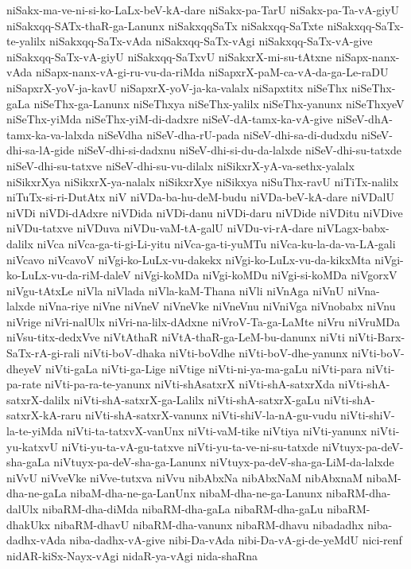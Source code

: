 {niSakx-ma-ve-ni-si-ko-LaLx-beV-kA-dare
niSakx-pa-TarU
niSakx-pa-Ta-vA-giyU
niSakxqq-SATx-thaR-ga-Lanunx
niSakxqqSaTx
niSakxqq-SaTxte
niSakxqq-SaTx-te-yalilx
niSakxqq-SaTx-vAda
niSakxqq-SaTx-vAgi
niSakxqq-SaTx-vA-give
niSakxqq-SaTx-vA-giyU
niSakxqq-SaTxvU
niSakxrX-mi-su-tAtxne
niSapx-nanx-vAda
niSapx-nanx-vA-gi-ru-vu-da-riMda
niSapxrX-paM-ca-vA-da-ga-Le-raDU
niSapxrX-yoV-ja-kavU
niSapxrX-yoV-ja-ka-valalx
niSapxtitx
niSeThx
niSeThx-gaLa
niSeThx-ga-Lanunx
niSeThxya
niSeThx-yalilx
niSeThx-yanunx
niSeThxyeV
niSeThx-yiMda
niSeThx-yiM-di-dadxre
niSeV-dA-tamx-ka-vA-give
niSeV-dhA-tamx-ka-va-lalxda
niSeVdha
niSeV-dha-rU-pada
niSeV-dhi-sa-di-dudxdu
niSeV-dhi-sa-lA-gide
niSeV-dhi-si-dadxnu
niSeV-dhi-si-du-da-lalxde
niSeV-dhi-su-tatxde
niSeV-dhi-su-tatxve
niSeV-dhi-su-vu-dilalx
niSikxrX-yA-va-sethx-yalalx
niSikxrXya
niSikxrX-ya-nalalx
niSikxrXye
niSikxya
niSuThx-ravU
niTiTx-nalilx
niTuTx-si-ri-DutAtx
niV
niVDa-ba-hu-deM-budu
niVDa-beV-kA-dare
niVDalU
niVDi
niVDi-dAdxre
niVDida
niVDi-danu
niVDi-daru
niVDide
niVDitu
niVDive
niVDu-tatxve
niVDuva
niVDu-vaM-tA-galU
niVDu-vi-rA-dare
niVLagx-babx-dalilx
niVca
niVca-ga-ti-gi-Li-yitu
niVca-ga-ti-yuMTu
niVca-ku-la-da-va-LA-gali
niVcavo
niVcavoV
niVgi-ko-LuLx-vu-dakekx
niVgi-ko-LuLx-vu-da-kikxMta
niVgi-ko-LuLx-vu-da-riM-daleV
niVgi-koMDa
niVgi-koMDu
niVgi-si-koMDa
niVgorxV
niVgu-tAtxLe
niVla
niVlada
niVla-kaM-Thana
niVli
niVnAga
niVnU
niVna-lalxde
niVna-riye
niVne
niVneV
niVneVke
niVneVnu
niVniVga
niVnobabx
niVnu
niVrige
niVri-nalUlx
niVri-na-lilx-dAdxne
niVroV-Ta-ga-LaMte
niVru
niVruMDa
niVsu-titx-dedxVve
niVtAthaR
niVtA-thaR-ga-LeM-bu-danunx
niVti
niVti-Barx-SaTx-rA-gi-rali
niVti-boV-dhaka
niVti-boVdhe
niVti-boV-dhe-yanunx
niVti-boV-dheyeV
niVti-gaLa
niVti-ga-Lige
niVtige
niVti-ni-ya-ma-gaLu
niVti-para
niVti-pa-rate
niVti-pa-ra-te-yanunx
niVti-shAsatxrX
niVti-shA-satxrXda
niVti-shA-satxrX-dalilx
niVti-shA-satxrX-ga-Lalilx
niVti-shA-satxrX-gaLu
niVti-shA-satxrX-kA-raru
niVti-shA-satxrX-vanunx
niVti-shiV-la-nA-gu-vudu
niVti-shiV-la-te-yiMda
niVti-ta-tatxvX-vanUnx
niVti-vaM-tike
niVtiya
niVti-yanunx
niVti-yu-katxvU
niVti-yu-ta-vA-gu-tatxve
niVti-yu-ta-ve-ni-su-tatxde
niVtuyx-pa-deV-sha-gaLa
niVtuyx-pa-deV-sha-ga-Lanunx
niVtuyx-pa-deV-sha-ga-LiM-da-lalxde
niVvU
niVveVke
niVve-tutxva
niVvu
nibAbxNa
nibAbxNaM
nibAbxnaM
nibaM-dha-ne-gaLa
nibaM-dha-ne-ga-LanUnx
nibaM-dha-ne-ga-Lanunx
nibaRM-dha-dalUlx
nibaRM-dha-diMda
nibaRM-dha-gaLa
nibaRM-dha-gaLu
nibaRM-dhakUkx
nibaRM-dhavU
nibaRM-dha-vanunx
nibaRM-dhavu
nibadadhx
niba-dadhx-vAda
niba-dadhx-vA-give
nibi-Da-vAda
nibi-Da-vA-gi-de-yeMdU
nici-renf
nidAR-kiSx-Nayx-vAgi
nidaR-ya-vAgi
nida-shaRna
}
